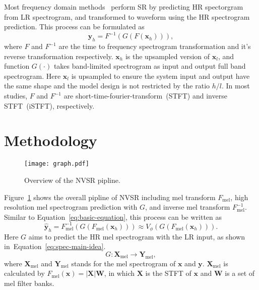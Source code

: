 \documentclass[a4paper]{article}
\def\Figref#1{Figure~\ref{#1}}
\def\Eqref#1{Equation~\ref{#1}}
\def\vx{{\mathbf{x}}}
\def\vy{{\mathbf{y}}}
\def\mW{{\bm{W}}}
\def\mX{{\mathbf{X}}}
\def\mY{{\mathbf{Y}}}
\begin{document}
Most frequency domain methods~\cite{audio-supre-resolution-SR-kuleshov2017audio, tf-network-sr-lim2018time} perform SR by predicting HR spectorgram from LR spectrogram, and transformed to waveform using the HR spectrogram prediction. This process can be formulated as 
\begin{equation}
  \label{eq:basic-equation}
  \vy_{h}=F^{-1}(G(F(\vx_{h}))),
\end{equation}
where $F$ and $F^{-1}$ are the time to frequency spectrogram transformation and it's reverse transformation respectively. $\vx_{h}$ is the upsampled version of $\vx_{l}$, and function $G(\cdot)$ takes band-limited spectrogram as input and output full band spectrogram. Here $\vx_{l}$ is upsampled to ensure the system input and output have the same shape and the model design is not restricted by the ratio $h/l$. In most studies, $F$ and $F^{-1}$ are short-time-fourier-transform~(STFT) and inverse STFT~(iSTFT), respectively.





\section{Methodology}
\label{sec:methodology}
\begin{figure}[htbp] \centering
  \texttt{[image: graph.pdf]}
  \caption{Overview of the NVSR pipline.}
  \label{fig-main}
\end{figure}

\Figref{fig-main} shows the overall pipline of NVSR including mel transform $F_\text{mel}$, high resolution mel spectrogram prediction with $G$, and inverse mel transform $F_\text{mel}^{-1}$. Similar to \Eqref{eq:basic-equation}, this process can be written as
\begin{equation}
  \label{eq: NVSR_equation}
  \hat{\vy}_{h}=F_\text{mel}^{-1}(G(F_\text{mel}(\vx_{h}))) \approx V_{\phi}(G(F_\text{mel}(\vx_{h}))).
\end{equation}
Here $G$ aims to predict the HR mel spectrogram with the LR input, as shown in~\Eqref{eq:spec-main-idea}. 
\begin{equation}
  \label{eq:spec-main-idea}
  G: \mX_\text{mel} \to \mY_\text{mel},
\end{equation}
where $\mX_\text{mel}$ and $\mY_\text{mel}$ stands for the mel spectrogram of $\vx$ and $\vy$. $\mX_\text{mel}$ is calculated by $F_\text{mel}(\vx)=\left| \mX \right| \mW$, in which $\mX$ is the STFT of $\vx$ and $\mW$ is a set of mel filter banks.
\end{document}
